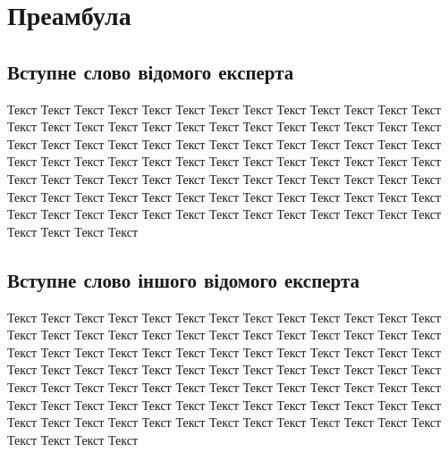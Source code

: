 


\chapter*{Преамбула}

\section*{Вступне слово відомого експерта}
Текст Текст Текст Текст Текст Текст Текст Текст Текст Текст Текст Текст Текст Текст Текст Текст Текст Текст Текст Текст Текст Текст Текст Текст Текст Текст Текст Текст Текст Текст Текст Текст Текст Текст Текст Текст Текст Текст Текст Текст Текст Текст Текст Текст Текст Текст Текст Текст Текст Текст Текст Текст Текст Текст Текст Текст Текст Текст Текст Текст Текст Текст Текст Текст Текст Текст Текст Текст Текст Текст Текст Текст Текст Текст Текст Текст Текст Текст Текст Текст Текст Текст Текст Текст Текст Текст Текст Текст Текст Текст Текст Текст Текст Текст Текст 

\section*{Вступне слово іншого відомого експерта}
Текст Текст Текст Текст Текст Текст Текст Текст Текст Текст Текст Текст Текст Текст Текст Текст Текст Текст Текст Текст Текст Текст Текст Текст Текст Текст Текст Текст Текст Текст Текст Текст Текст Текст Текст Текст Текст Текст Текст Текст Текст Текст Текст Текст Текст Текст Текст Текст Текст Текст Текст Текст Текст Текст Текст Текст Текст Текст Текст Текст Текст Текст Текст Текст Текст Текст Текст Текст Текст Текст Текст Текст Текст Текст Текст Текст Текст Текст Текст Текст Текст Текст Текст Текст Текст Текст Текст Текст Текст Текст Текст Текст Текст Текст Текст 